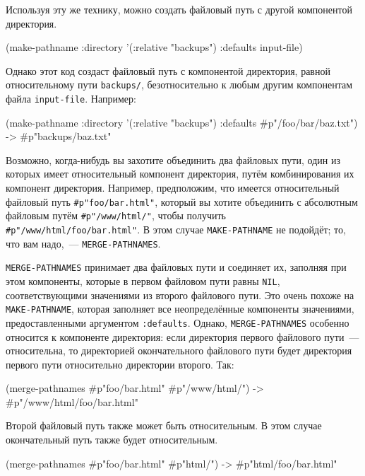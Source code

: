 Используя эту же технику, можно создать файловый путь с другой компонентой директория.

\begin{myverb}
(make-pathname :directory '(:relative "backups") :defaults input-file) 
\end{myverb}

Однако этот код создаст файловый путь с компонентой директория, равной относительному пути
\lstinline!backups/!, безотносительно к любым другим компонентам файла \lstinline!input-file!.
Например:

\begin{myverb}
(make-pathname :directory '(:relative "backups") 
               :defaults #p"/foo/bar/baz.txt") -> #p"backups/baz.txt" 
\end{myverb}

Возможно, когда-нибудь вы захотите объединить два файловых пути, один из которых имеет
относительный компонент директория, путём комбинирования их компонент
директория. Например, предположим, что имеется относительный файловый путь
\lstinline!#p"foo/bar.html"!, который вы хотите объединить с абсолютным файловым путём
\lstinline!#p"/www/html/"!, чтобы получить \lstinline!#p"/www/html/foo/bar.html"!. В этом
случае \lstinline{MAKE-PATHNAME} не подойдёт; то, что вам надо,~--- \lstinline{MERGE-PATHNAMES}.

\lstinline{MERGE-PATHNAMES} принимает два файловых пути и соединяет их, заполняя при этом
компоненты, которые в первом файловом пути равны \lstinline{NIL}, соответствующими значениями
из второго файлового пути. Это очень похоже на \lstinline{MAKE-PATHNAME}, которая заполняет все
неопределённые компоненты значениями, предоставленными аргументом
\lstinline{:defaults}. Однако, \lstinline{MERGE-PATHNAMES} особенно относится к компоненте
директория: если директория первого файлового пути~--- относительна, то директорией
окончательного файлового пути будет директория первого пути относительно директории
второго. Так:

\begin{myverb}
(merge-pathnames #p"foo/bar.html" #p"/www/html/") -> #p"/www/html/foo/bar.html" 
\end{myverb}

Второй файловый путь также может быть относительным. В этом случае окончательный путь
также будет относительным.

\begin{myverb}
(merge-pathnames #p"foo/bar.html" #p"html/") -> #p"html/foo/bar.html" 
\end{myverb}

